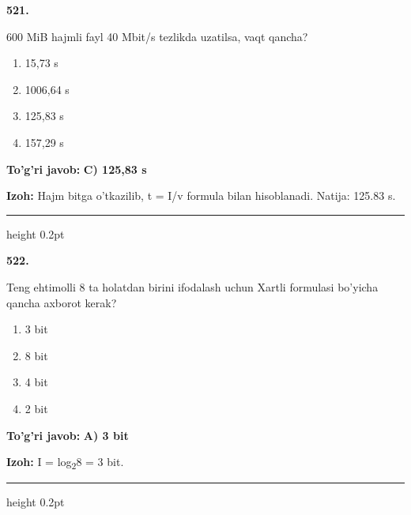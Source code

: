 \documentclass[10pt,a4paper,oneside]{article}
\begin{document}
\noindent\textbf{\color{ink}521.}
\par
600 MiB hajmli fayl 40 Mbit/s tezlikda uzatilsa, vaqt qancha?
\begin{enumerate}[label=\Alph*),leftmargin=9mm]
\item 15,73 s
\item 1006,64 s
\item 125,83 s
\item 157,29 s
\end{enumerate}
\begin{tcolorbox}[enhanced,breakable,colback=teal!4,colframe=teal!50!black,boxrule=0.5pt,arc=1.1mm,left=3mm,right=3mm,top=1.7mm,bottom=1.7mm,before skip=2mm,after skip=2mm]
\textbf{\color{teal}To'g'ri javob:} \textbf{C) 125,83 s}
\par\smallskip
\textbf{Izoh:} Hajm bitga o'tkazilib, t = I/v formula bilan hisoblanadi. Natija: 125.83 s.
\end{tcolorbox}
\vspace{2mm}\hrule height 0.2pt \vspace{3mm}

\noindent\textbf{\color{ink}522.}
\par
Teng ehtimolli 8 ta holatdan birini ifodalash uchun Xartli formulasi bo'yicha qancha axborot kerak?
\begin{enumerate}[label=\Alph*),leftmargin=9mm]
\item 3 bit
\item 8 bit
\item 4 bit
\item 2 bit
\end{enumerate}
\begin{tcolorbox}[enhanced,breakable,colback=teal!4,colframe=teal!50!black,boxrule=0.5pt,arc=1.1mm,left=3mm,right=3mm,top=1.7mm,bottom=1.7mm,before skip=2mm,after skip=2mm]
\textbf{\color{teal}To'g'ri javob:} \textbf{A) 3 bit}
\par\smallskip
\textbf{Izoh:} I = log\textsubscript{2}8 = 3 bit.
\end{tcolorbox}
\vspace{2mm}\hrule height 0.2pt \vspace{3mm}
\end{document}
